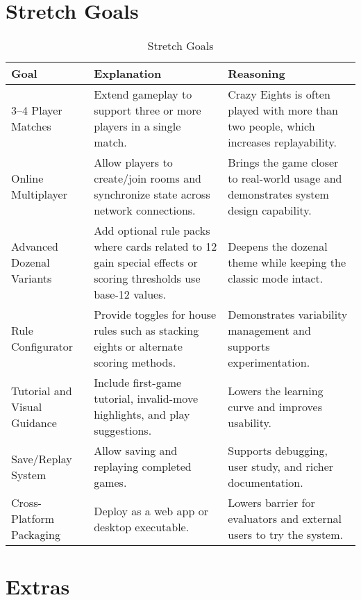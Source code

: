 \documentclass{article}
\begin{document}
    \section{Stretch Goals}

    \begin{table}[h!]
        \caption{Stretch Goals} \label{TblStretchGoals}
        \begin{tabularx}{\textwidth}{|l|X|X|}
            \hline
            \textbf{Goal} & \textbf{Explanation} & \textbf{Reasoning} \\
            \hline
            3–4 Player Matches & Extend gameplay to support three or more players in a single match. & Crazy Eights is often played with more than two people, which increases replayability. \\
            \hline
            Online Multiplayer & Allow players to create/join rooms and synchronize state across network connections. & Brings the game closer to real-world usage and demonstrates system design capability. \\
            \hline
            Advanced Dozenal Variants & Add optional rule packs where cards related to 12 gain special effects or scoring thresholds use base-12 values. & Deepens the dozenal theme while keeping the classic mode intact. \\
            \hline
            Rule Configurator & Provide toggles for house rules such as stacking eights or alternate scoring methods. & Demonstrates variability management and supports experimentation. \\
            \hline
            Tutorial and Visual Guidance & Include first-game tutorial, invalid-move highlights, and play suggestions. & Lowers the learning curve and improves usability. \\
            \hline
            Save/Replay System & Allow saving and replaying completed games. & Supports debugging, user study, and richer documentation. \\
            \hline
            Cross-Platform Packaging & Deploy as a web app or desktop executable. & Lowers barrier for evaluators and external users to try the system. \\
            \hline
        \end{tabularx}
    \end{table}


    \section{Extras}
\end{document}
